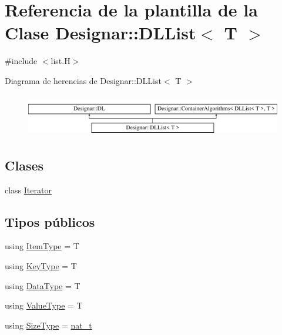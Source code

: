 \hypertarget{class_designar_1_1_d_l_list}{}\section{Referencia de la plantilla de la Clase Designar\+:\+:D\+L\+List$<$ T $>$}
\label{class_designar_1_1_d_l_list}


{\ttfamily \#include $<$list.\+H$>$}

Diagrama de herencias de Designar\+:\+:D\+L\+List$<$ T $>$\begin{figure}[H]
\begin{center}
\leavevmode
\includegraphics[height=1.885522cm]{class_designar_1_1_d_l_list}
\end{center}
\end{figure}
\subsection*{Clases}
\begin{DoxyCompactItemize}
\item 
class \hyperlink{class_designar_1_1_d_l_list_1_1_iterator}{Iterator}
\end{DoxyCompactItemize}
\subsection*{Tipos públicos}
\begin{DoxyCompactItemize}
\item 
using \hyperlink{class_designar_1_1_d_l_list_a622fc13673b169c75309314ae2ebc005}{Item\+Type} = T
\item 
using \hyperlink{class_designar_1_1_d_l_list_ac27702ab24c52fa9d770abc3c455bb25}{Key\+Type} = T
\item 
using \hyperlink{class_designar_1_1_d_l_list_ac2f57201101389ca63aec1c2fba61038}{Data\+Type} = T
\item 
using \hyperlink{class_designar_1_1_d_l_list_a839e4da136d61d24ba8f14fb4d9ceb34}{Value\+Type} = T
\item 
using \hyperlink{class_designar_1_1_d_l_list_ac03520f15d4db4a31f8764ed5633e0c6}{Size\+Type} = \hyperlink{namespace_designar_aa72662848b9f4815e7bf31a7cf3e33d1}{nat\+\_\+t}
\end{DoxyCompactItemize}
